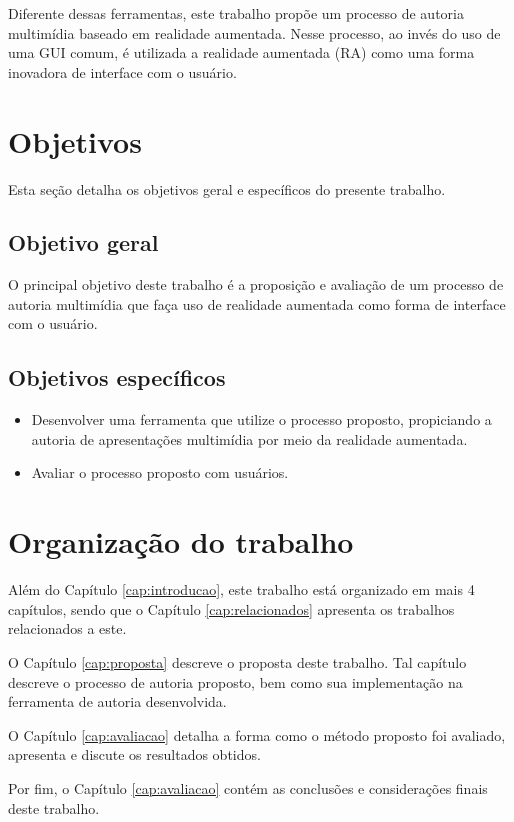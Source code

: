 \documentclass[../main.tex]{subfiles}
\begin{document}
Diferente dessas ferramentas, este trabalho propõe um processo de autoria multimídia baseado em realidade aumentada. Nesse processo, ao invés do uso de uma GUI comum, é utilizada a realidade aumentada (RA) como uma forma inovadora de interface com o usuário.  

\section{Objetivos}
    Esta seção detalha os objetivos geral e específicos do presente trabalho.
\subsection{Objetivo geral}
    O principal objetivo deste trabalho é a proposição e avaliação de um processo de autoria multimídia que faça uso de realidade aumentada como forma de interface com o usuário.
    
\subsection{Objetivos específicos}

\begin{itemize}
    \item Desenvolver uma ferramenta que utilize o processo proposto, propiciando a autoria de apresentações multimídia por meio da realidade aumentada.
    
    \item Avaliar o processo proposto com usuários.
\end{itemize}

\section{Organização do trabalho}

Além do Capítulo \ref{cap:introducao}, este trabalho está organizado em mais 4 capítulos, sendo que o Capítulo \ref{cap:relacionados} apresenta os trabalhos relacionados a este.


O Capítulo \ref{cap:proposta} descreve o proposta deste trabalho. Tal capítulo descreve o processo de autoria proposto, bem como sua implementação na ferramenta de autoria desenvolvida.

O Capítulo \ref{cap:avaliacao} detalha a forma como o método proposto foi avaliado, apresenta e discute os resultados obtidos.

Por fim, o Capítulo \ref{cap:avaliacao} contém as conclusões e considerações finais deste trabalho.
\end{document}

